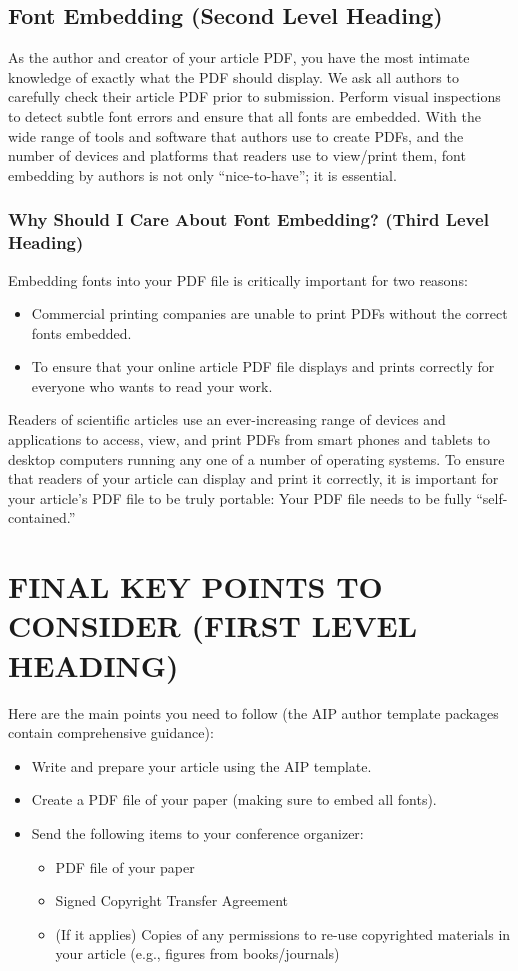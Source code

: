 \documentclass{aip-cp}
\begin{document}
\subsection{Font Embedding (Second Level Heading)}
As the author and creator of your article PDF, you have the most intimate knowledge of exactly what the PDF should display. We ask all authors to carefully check their article PDF prior to submission. Perform visual inspections to detect subtle font errors and ensure that all fonts are embedded. With the wide range of tools and software that authors use to create PDFs, and the number of devices and platforms that readers use to view/print them, font embedding by authors is not only ``nice-to-have''; it is essential. 

\subsubsection{Why Should I Care About Font Embedding? (Third Level Heading)}
Embedding fonts into your PDF file is critically important for two reasons:
\begin{itemize}
\item Commercial printing companies are unable to print PDFs without the correct fonts embedded.
\item To ensure that your online article PDF file displays and prints correctly for everyone who wants to read your work.
\end{itemize}

Readers of scientific articles use an ever-increasing range of devices and applications to access, view, and print PDFs  from smart phones and tablets to desktop computers running any one of a number of operating systems. To ensure that readers of  your article can display and print it correctly, it is important for your article's PDF file to be truly portable: Your PDF file needs to be fully ``self-contained.''\vfill\pagebreak

\section{FINAL KEY POINTS TO CONSIDER (FIRST LEVEL HEADING)}
Here are the main points you need to follow (the AIP author template packages contain comprehensive guidance):

\begin{itemize}
\item Write and prepare your article using the AIP template.
\item Create a PDF file of your paper (making sure to embed all fonts).
\item Send the following items to your conference organizer:
\begin{itemize}
\item PDF file of your paper
\item Signed Copyright Transfer Agreement
\item (If it applies) Copies of any permissions to re-use copyrighted materials in your article (e.g., figures from books/journals)
\end{itemize}
\end{itemize}
\end{document}
